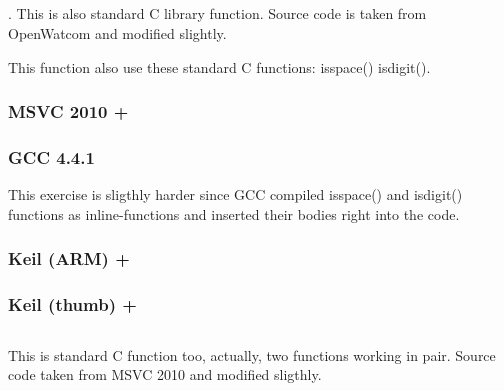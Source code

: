 

\subsection{}

. 
{This is also standard C library function. Source code is taken from OpenWatcom and modified slightly}.

{This function also use these standard C functions:} isspace() \AndENRU isdigit().

\subsubsection{MSVC 2010 + \Ox}



\subsubsection{GCC 4.4.1}

{This exercise is sligthly harder since GCC compiled isspace() and isdigit()
functions as inline-functions and inserted their bodies right into the code.}



\subsubsection{Keil (ARM) + \Othree}



\subsubsection{Keil (thumb) + \Othree}



\subsection{}

{This is standard C function too, actually, two functions working in pair.
Source code taken from MSVC 2010 and modified sligthly.}

